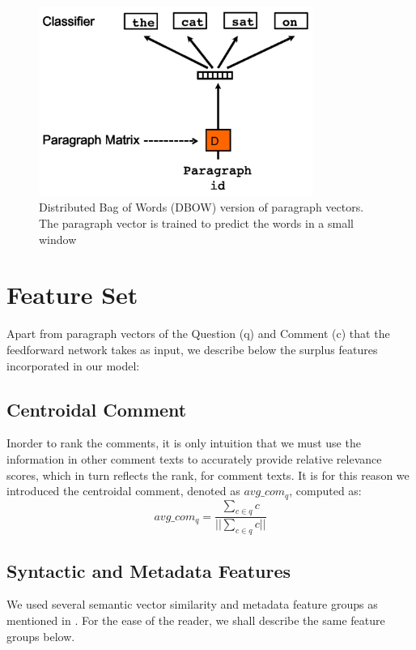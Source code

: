 \documentclass[12pt, a4paper, oneside]{Thesis} %
\begin{document}
\begin{figure}[t!]
  \centering
  \includegraphics[keepaspectratio, width=0.8\textwidth]{./Pictures/pv-dbow.png}
  \caption{Distributed Bag of Words (DBOW) version of paragraph vectors. The paragraph vector is trained to predict the words in a small window}
  \label{fig:pv-dbow}
\end{figure}

\section{Feature Set}
\label{subsection:feature-set}

Apart from paragraph vectors of the Question (q) and Comment (c) that the feedforward network takes as input, we describe below the surplus features incorporated in our model:

\subsection{Centroidal Comment}
\label{subsection:centroidal-comment}

Inorder to rank the comments, it is only intuition that we must use the information in other comment texts to accurately provide relative relevance scores, which in turn reflects the rank, for comment texts. It is for this reason we introduced the centroidal comment, denoted as $avg\_com_q$, computed as:
\[ avg\_com_q = \frac{\sum\limits_{c \in q} c}{||\sum\limits_{c \in q} c||} \tag{1} \label{equation:1} \]

\subsection{Syntactic and Metadata Features}
\label{subsection:extra-feat}
We used several semantic vector similarity and metadata feature groups as mentioned in \cite{mihaylov2016semanticz}. For the ease of the reader, we shall describe the same feature groups below. 
\end{document}
